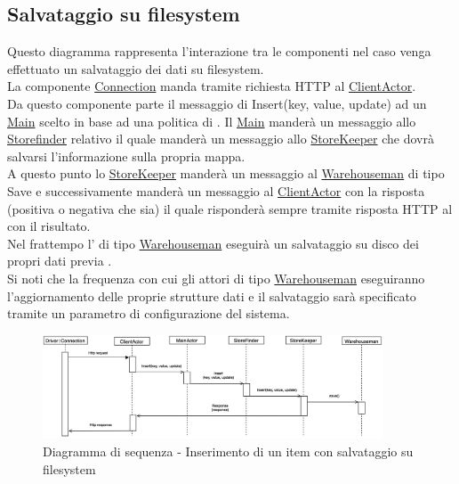 \documentclass{scalatekids-article}
\begin{document}
\subsection{Salvataggio su filesystem}

Questo diagramma rappresenta l'interazione tra le componenti nel caso venga
effettuato un salvataggio dei dati su filesystem.\\
La componente \hyperref[sec:actorbase::driver::client::Connection]{Connection}
manda tramite richiesta HTTP al \hyperref[sec:actorbase::actorsystem::actors::clientactor::ClientActor]{ClientActor}.\\
Da questo componente parte il messaggio di Insert(key, value, update) ad un \hyperref[sec:actorbase::actorsystem::actors::main::Main]{Main} scelto in base ad una
politica di . Il \hyperref[sec:actorbase::actorsystem::actors::main::Main]{Main} manderà un messaggio allo
\hyperref[sec:actorbase::actorsystem::actors::storefinder::Storefinder]{Storefinder} relativo il quale manderà un messaggio
allo \hyperref[sec:actorbase::actorsystem::actors::storekeeper::StoreKeeper]{StoreKeeper} che dovrà salvarsi l'informazione sulla propria mappa.\\
A questo punto lo \hyperref[sec:actorbase::actorsystem::actors::storekeeper::StoreKeeper]{StoreKeeper} manderà un messaggio al
\hyperref[sec:actorbase::actorsystem::actors::warehouseman::Warehouseman]{Warehouseman} di tipo Save e
successivamente manderà un messaggio al \hyperref[sec:actorbase::actorsystem::actors::clientactor::ClientActor]{ClientActor} con la risposta
(positiva o negativa che sia) il quale risponderà sempre tramite risposta HTTP al  con il risultato.\\
Nel frattempo l' di tipo \hyperref[sec:actorbase::actorsystem::actors::warehouseman::Warehouseman]{Warehouseman} eseguirà un salvataggio
su disco dei propri dati previa .\\
Si noti che la frequenza con cui gli attori di tipo \hyperref[sec:actorbase::actorsystem::actors::warehouseman::Warehouseman]{Warehouseman} eseguiranno
l'aggiornamento delle proprie strutture dati e il salvataggio sarà specificato
tramite un parametro di configurazione del sistema.\\
\begin{figure}[H]
  \begin{center}
    \includegraphics[width=0.9\textwidth, keepaspectratio]{img/diagrammiSequenza/esempioSave.png}
    \caption{Diagramma di sequenza - Inserimento di un item con salvataggio su filesystem}
  \end{center}
\end{figure}
\end{document}
